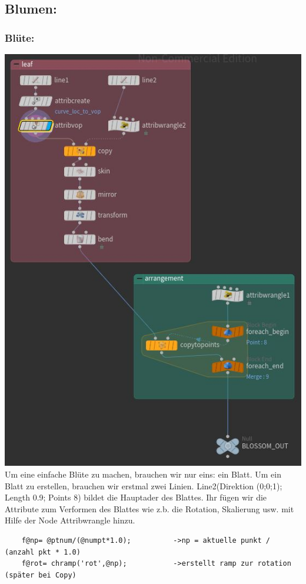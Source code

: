 \begin{​itemize}
\subsection*{​Blumen:}
\subsubsection*{​Blüte:}
\includegraphics*[width=\textwidth]{graphics/blossom.JPG}
Um eine einfache Blüte zu machen, brauchen wir nur eins: ein Blatt. Um ein Blatt zu erstellen, brauchen wir erstmal zwei Linien. Line2(Direktion (0;0;1); Length 0.9; Points 8) bildet die Hauptader des Blattes. Ihr fügen wir die Attribute zum Verformen des Blattes wie z.b. die Rotation, Skalierung usw. mit Hilfe der Node Attribwrangle hinzu.
\begin{lstlisting}
	f@np= @ptnum/(@numpt*1.0);     	 	->np = aktuelle punkt / (anzahl pkt * 1.0)
	f@rot= chramp('rot',@np); 			->erstellt ramp zur rotation (später bei Copy)

\end{lstlisting}
\end{​itemize}
